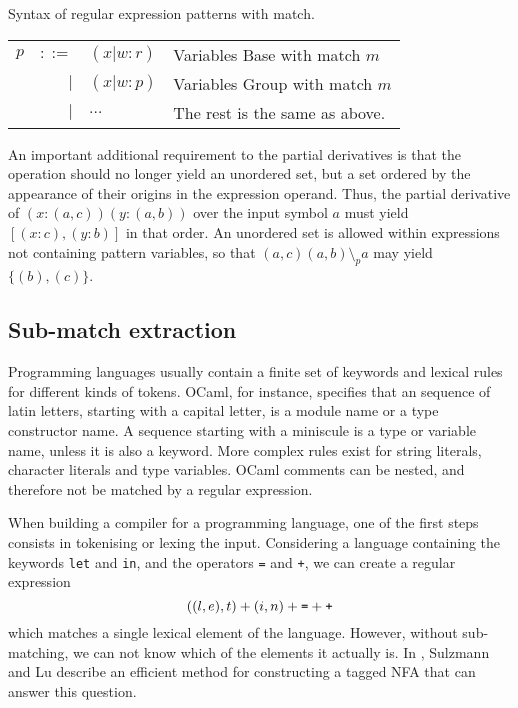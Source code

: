 \begin{defn}
   \label{defn-pat-with-match}
   Syntax of regular expression patterns with match.

   \begin{tabular}{lrll}
      $p$	& $::=$	& $(x|w:r)$	& Variables Base  with match $m$	\\
		& $|$	& $(x|w:p)$	& Variables Group with match $m$	\\
		& $|$	& $\dots$	& The rest is the same as above.	\\
   \end{tabular}
\end{defn}

An important additional requirement to the partial derivatives is that the
operation should no longer yield an unordered set, but a set ordered by the
appearance of their origins in the expression operand. Thus, the partial
derivative of $(x:(a,c))(y:(a,b))$ over the input symbol $a$ must yield
$[(x:c),(y:b)]$ in that order. An unordered set is allowed within expressions
not containing pattern variables, so that $(a,c)(a,b) \setminus_p a$ may yield
$\{(b),(c)\}$.

\subsection{Sub-match extraction}

Programming languages usually contain a finite set of keywords and lexical rules
for different kinds of tokens. OCaml, for instance, specifies that an sequence
of latin letters, starting with a capital letter, is a module name or a type
constructor name. A sequence starting with a miniscule is a type or variable
name, unless it is also a keyword. More complex rules exist for string literals,
character literals and type variables. OCaml comments can be nested, and
therefore not be matched by a regular expression.

When building a compiler for a programming language, one of the first steps
consists in tokenising or lexing the input. Considering a language containing
the keywords \verb!let! and \verb!in!, and the operators \verb!=! and \verb!+!,
we can create a regular expression
%
\[((l,e),t) + (i,n) + \verb'=' + \verb'+'\]
%
which matches a single lexical element of the language. However, without
sub-matching, we can not know which of the elements it actually is. In
\cite{pdpat}, Sulzmann and Lu describe an efficient method for constructing a
tagged NFA that can answer this question.

